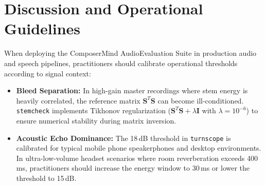 \documentclass[10pt,journal,compsoc]{IEEEtran}
\begin{document}
\begin{table}[t]
\centering
\caption{Quantitative Benchmark Results on MUSDB18-HQ and MagicHub Corpora.}
\label{tab:benchmark_results}
\end{table}

\section{Discussion and Operational Guidelines}
When deploying the ComposerMind AudioEvaluation Suite in production audio and speech pipelines, practitioners should calibrate operational thresholds according to signal context:
\begin{itemize}
    \item \textbf{Bleed Separation:} In high-gain master recordings where stem energy is heavily correlated, the reference matrix $\mathbf{S}^T \mathbf{S}$ can become ill-conditioned. \texttt{stemcheck} implements Tikhonov regularization ($\mathbf{S}^T \mathbf{S} + \lambda \mathbf{I}$ with $\lambda = 10^{-6}$) to ensure numerical stability during matrix inversion.
    \item \textbf{Acoustic Echo Dominance:} The 18\,dB threshold in \texttt{turnscope} is calibrated for typical mobile phone speakerphones and desktop environments. In ultra-low-volume headset scenarios where room reverberation exceeds 400\,ms, practitioners should increase the energy window to 30\,ms or lower the threshold to 15\,dB.
\end{itemize}
\end{document}
